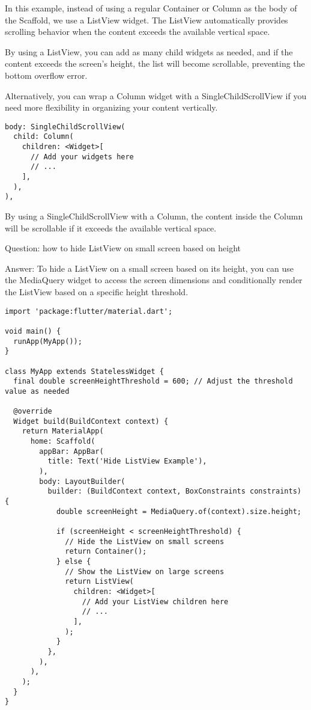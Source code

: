 In this example, instead of using a regular Container or Column as the body of the Scaffold, we use a ListView widget. 
The ListView automatically provides scrolling behavior when the content exceeds the available vertical space.

By using a ListView, you can add as many child widgets as needed, and if the content exceeds the screen's height, 
the list will become scrollable, preventing the bottom overflow error.

Alternatively, you can wrap a Column widget with a SingleChildScrollView if you need more flexibility in organizing 
your content vertically.

\begin{lstlisting}
body: SingleChildScrollView(
  child: Column(
    children: <Widget>[
      // Add your widgets here
      // ...
    ],
  ),
),
\end{lstlisting}

By using a SingleChildScrollView with a Column, the content inside the Column will be scrollable if it exceeds the 
available vertical space.

Question: how to hide ListView on small screen based on height

Answer: To hide a ListView on a small screen based on its height, you can use the MediaQuery widget to access the 
screen dimensions and conditionally render the ListView based on a specific height threshold.

\begin{lstlisting}
import 'package:flutter/material.dart';

void main() {
  runApp(MyApp());
}

class MyApp extends StatelessWidget {
  final double screenHeightThreshold = 600; // Adjust the threshold value as needed

  @override
  Widget build(BuildContext context) {
    return MaterialApp(
      home: Scaffold(
        appBar: AppBar(
          title: Text('Hide ListView Example'),
        ),
        body: LayoutBuilder(
          builder: (BuildContext context, BoxConstraints constraints) {
            double screenHeight = MediaQuery.of(context).size.height;

            if (screenHeight < screenHeightThreshold) {
              // Hide the ListView on small screens
              return Container();
            } else {
              // Show the ListView on large screens
              return ListView(
                children: <Widget>[
                  // Add your ListView children here
                  // ...
                ],
              );
            }
          },
        ),
      ),
    );
  }
}
\end{lstlisting}

